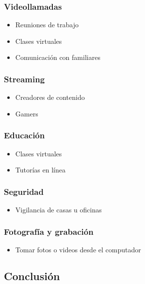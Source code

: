 \documentclass[12pt, letterpaper]{article}
\begin{document}
\FloatBarrier

\subsubsection*{Videollamadas}
\begin{itemize}
  \item Reuniones de trabajo
  \item Clases virtuales
  \item Comunicación con familiares
\end{itemize}

\subsubsection*{Streaming}
\begin{itemize}
  \item Creadores de contenido
  \item Gamers
\end{itemize}

\subsubsection*{Educación}
\begin{itemize}
  \item Clases virtuales
  \item Tutorías en línea
\end{itemize}

\subsubsection*{Seguridad}
\begin{itemize}
  \item Vigilancia de casas u oficinas
\end{itemize}

\subsubsection*{Fotografía y grabación}
\begin{itemize}
  \item Tomar fotos o videos desde el computador
\end{itemize}

\subsection{Conclusión}
\end{document}
